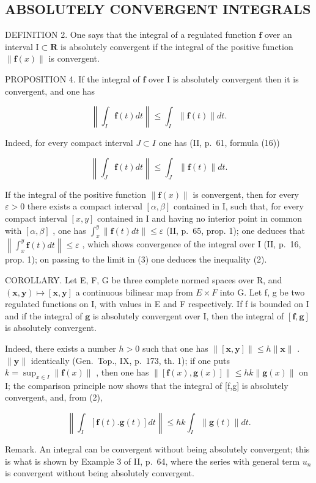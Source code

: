 \subsection{ABSOLUTELY CONVERGENT INTEGRALS}

DEFINITION 2. One says that the integral of a regulated function \(\mathbf{f}\) over an interval \(\mathrm{I} \subset \mathbf{R}\) is absolutely convergent if the integral of the positive function \(\| \mathbf{f}(x) \|\) is convergent.

PROPOSITION 4. If the integral of \(\mathbf{f}\) over \(\mathrm{I}\) is absolutely convergent then it is convergent, and one has

\[
\left\| \int_ {I} \mathbf {f} (t) d t \right\| \leqslant \int_ {I} \| \mathbf {f} (t) \| d t.\tag{2}
\]

Indeed, for every compact interval \(J \subset I\) one has (II, p.~61, formula (16))

\[
\left\| \int_ {J} \mathbf {f} (t) d t \right\| \leqslant \int_ {J} \| \mathbf {f} (t) \| d t.\tag{3}
\]

If the integral of the positive function \(\|\mathbf{f}(x)\|\) is convergent, then for every \(\varepsilon > 0\) there exists a compact interval \([\alpha, \beta]\) contained in I, such that, for every compact interval \([x, y]\) contained in I and having no interior point in common with \([\alpha, \beta]\) , one has \(\int_{x}^{y} \|\mathbf{f}(t) dt\| \leqslant \varepsilon\) (II, p.~65, prop. 1); one deduces that \(\left\|\int_{x}^{y} \mathbf{f}(t) dt\right\| \leqslant \varepsilon\) , which shows convergence of the integral over I (II, p.~16, prop. 1); on passing to the limit in (3) one deduces the inequality (2).

COROLLARY. Let E, F, G be three complete normed spaces over R, and \((\mathbf{x}, \mathbf{y}) \mapsto [\mathbf{x}, \mathbf{y}]\) a continuous bilinear map from \(E \times F\) into G. Let f, g be two regulated functions on I, with values in E and F respectively. If f is bounded on I and if the integral of \(\mathbf{g}\) is absolutely convergent over I, then the integral of \([\mathbf{f},\mathbf{g}]\) is absolutely convergent.

Indeed, there exists a number \(h > 0\) such that one has \(\| [\mathbf{x},\mathbf{y}] \| \leqslant h \| \mathbf{x} \|\) . \(\| \mathbf{y} \|\) identically (Gen.~Top., IX, p.~173, th. 1); if one puts \(k = \sup_{x \in I} \| \mathbf{f}(x) \|\) , then one has \(\| [\mathbf{f}(x),\mathbf{g}(x)] \| \leqslant hk \| \mathbf{g}(x) \|\) on I; the comparison principle now shows that the integral of {[}f,g{]} is absolutely convergent, and, from (2),

\[
\left\| \int_ {I} [ \mathbf {f} (t). \mathbf {g} (t) ] d t \right\| \leqslant h k \int_ {I} \| \mathbf {g} (t) \| d t.
\]

Remark. An integral can be convergent without being absolutely convergent; this is what is shown by Example 3 of II, p.~64, where the series with general term \(u_{n}\) is convergent without being absolutely convergent.

